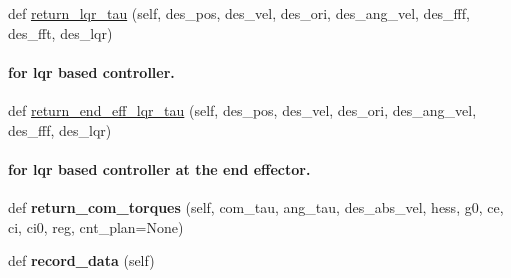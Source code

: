 \begin{DoxyCompactItemize}
\item 
def \hyperlink{classpython_1_1dg__tools_1_1leg__impedance__control_1_1quad__leg__impedance__controller_1_1QuadrupedComControl_a7b2d46aa0abd8e9ced9e3cce2147d124}{return\+\_\+lqr\+\_\+tau} (self, des\+\_\+pos, des\+\_\+vel, des\+\_\+ori, des\+\_\+ang\+\_\+vel, des\+\_\+fff, des\+\_\+fft, des\+\_\+lqr)
\begin{DoxyCompactList}\small\item\em \paragraph*{for lqr based controller.}\end{DoxyCompactList}\item 
def \hyperlink{classpython_1_1dg__tools_1_1leg__impedance__control_1_1quad__leg__impedance__controller_1_1QuadrupedComControl_a68a8b7ea897a69259d9409e0f703b7d3}{return\+\_\+end\+\_\+eff\+\_\+lqr\+\_\+tau} (self, des\+\_\+pos, des\+\_\+vel, des\+\_\+ori, des\+\_\+ang\+\_\+vel, des\+\_\+fff, des\+\_\+lqr)
\begin{DoxyCompactList}\small\item\em \paragraph*{for lqr based controller at the end effector.}\end{DoxyCompactList}\item 
def {\bfseries return\+\_\+com\+\_\+torques} (self, com\+\_\+tau, ang\+\_\+tau, des\+\_\+abs\+\_\+vel, hess, g0, ce, ci, ci0, reg, cnt\+\_\+plan=None)\hypertarget{classpython_1_1dg__tools_1_1leg__impedance__control_1_1quad__leg__impedance__controller_1_1QuadrupedComControl_a44644610db1d8cce8f1bbe31c4225382}{}\label{classpython_1_1dg__tools_1_1leg__impedance__control_1_1quad__leg__impedance__controller_1_1QuadrupedComControl_a44644610db1d8cce8f1bbe31c4225382}

\item 
def {\bfseries record\+\_\+data} (self)\hypertarget{classpython_1_1dg__tools_1_1leg__impedance__control_1_1quad__leg__impedance__controller_1_1QuadrupedComControl_a40cbf1bb320c3c8272346a988b190051}{}\label{classpython_1_1dg__tools_1_1leg__impedance__control_1_1quad__leg__impedance__controller_1_1QuadrupedComControl_a40cbf1bb320c3c8272346a988b190051}

\end{DoxyCompactItemize}
